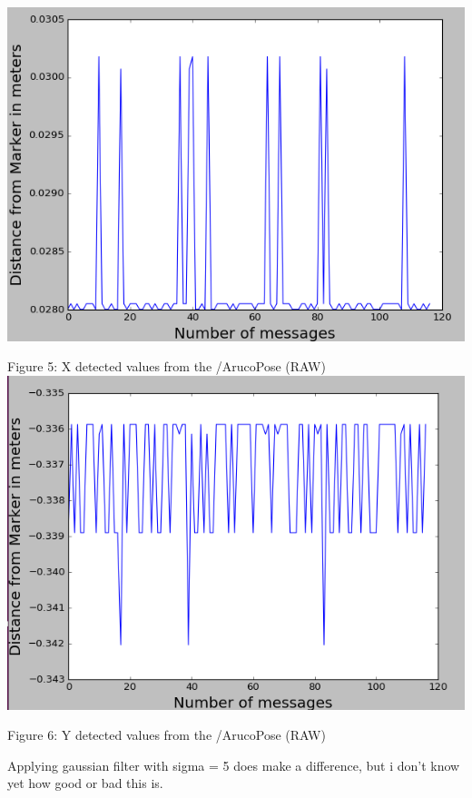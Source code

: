 \documentclass{article}
\begin{document}
\begin{center}
    \includegraphics[scale=0.5]{pictures/pic12.png}
    
    Figure 5: X detected values from the /ArucoPose (RAW)
    \includegraphics[scale=0.5]{pictures/pic13.png}
    
    Figure 6: Y detected values from the /ArucoPose (RAW)
\end{center}

Applying gaussian filter with sigma = 5 does make a difference, but i don't know yet how good or bad this is.
\end{document}
